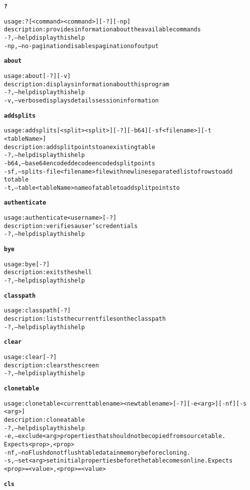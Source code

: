 \begin{alltt}
\textbf{?}

    usage: ? [ <command>{ <command>} ] [-?] [-np]
    description: provides information about the available commands
      -?,--help  display this help
      -np,--no-pagination  disables pagination of output

\textbf{about}

    usage: about [-?] [-v]
    description: displays information about this program
      -?,--help  display this help
      -v,--verbose	displays details session information

\textbf{addsplits}

    usage: addsplits [<split>{ <split>} ] [-?] [-b64] [-sf <filename>] [-t
    	      <tableName>]
    description: add split points to an existing table
      -?,--help  display this help
      -b64,--base64encoded	decode encoded split points
      -sf,--splits-file <filename>	file with newline separated list of rows to add
    	      to table
      -t,--table <tableName>  name of a table to add split points to

\textbf{authenticate}

    usage: authenticate <username> [-?]
    description: verifies a user's credentials
      -?,--help  display this help

\textbf{bye}

    usage: bye [-?]
    description: exits the shell
      -?,--help  display this help

\textbf{classpath}

    usage: classpath [-?]
    description: lists the current files on the classpath
      -?,--help  display this help

\textbf{clear}

    usage: clear [-?]
    description: clears the screen
      -?,--help  display this help

\textbf{clonetable}

    usage: clonetable <current table name> <new table name> [-?] [-e <arg>] [-nf] [-s
    	      <arg>]
    description: clone a table
      -?,--help  display this help
      -e,--exclude <arg>  properties that should not be copied from source table.
    	      Expects <prop>{,<prop>}
      -nf,--noFlush  do not flush table data in memory before cloning.
      -s,--set <arg>  set initial properties before the table comes online. Expects
    	      <prop>=<value>{,<prop>=<value>}

\textbf{cls}


\end{alltt}
